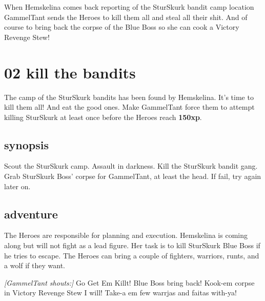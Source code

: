When Hemskelina comes back reporting of the SturSkurk bandit camp location GammelTant sends the Heroes to kill them all and steal all their shit. And of course to bring back the corpse of the Blue Boss so she can cook a Victory Revenge Stew!










\clearpage
\section*{02 kill the bandits}
\label{02killthebandits}

The camp of the SturSkurk bandits has been found by Hemskelina. It's time to kill them all! And eat the good ones.
Make GammelTant force them to attempt killing SturSkurk at least once before the Heroes reach \textbf{150xp}.


\subsection*{synopsis}

Scout the SturSkurk camp. Assault in darkness. Kill the SturSkurk bandit gang. Grab SturSkurk Boss' corpse for GammelTant, at least the head. If fail, try again later on.


\subsection*{adventure}

The Heroes are responsible for planning and execution. Hemskelina is coming along but will not fight as a lead figure. Her task is to kill SturSkurk Blue Boss if he tries to escape.
The Heroes can bring a couple of fighters, warriors, runts, and a wolf if they want.

\begin{readoutloud}
\emph{[GammelTant shouts:]}
Go Get Em Killt! Blue Boss bring back! Kook-em corpse in Victory Revenge Stew I will! Take-a em few warrjas and faitas with-ya!
\end{readoutloud}

